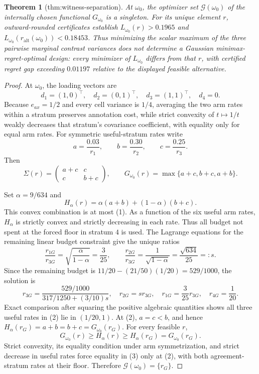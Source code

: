\documentclass{article}
\newtheorem{theorem}{Theorem}
\begin{document}
\begin{theorem}[thm:witness-separation]\label{thm:witness-separation}
At \(\omega_0\), the optimizer set \(\mathcal G(\omega_0)\) of the internally chosen functional \(G_{\omega_0}\) is a singleton. For its unique element \(r\), outward-rounded certificates establish \(L_{\omega_0}(r)>0.1965\) and \(L_{\omega_0}(r_{\mathrm{alt}}(\omega_0))<0.18453\). Thus minimizing the scalar maximum of the three pairwise marginal contrast variances does not determine a Gaussian minimax-regret-optimal design: every minimizer of \(L_{\omega_0}\) differs from that \(r\), with certified regret gap exceeding \(0.01197\) relative to the displayed feasible alternative.
\end{theorem}
\begin{proof}
At \(\omega_0\), the loading vectors are
\[
 d_1=(1,0)^\top,\quad d_2=(0,1)^\top,\quad d_3=(1,1)^\top,\quad d_4=0.
\]
Because \(e_{ax}=1/2\) and every cell variance is \(1/4\), averaging the two arm rates within a stratum preserves annotation cost, while strict convexity of \(t\mapsto1/t\) weakly decreases that stratum's covariance coefficient, with equality only for equal arm rates.  For symmetric useful-stratum rates write
\[
 a=\frac{0.03}{r_1},\qquad b=\frac{0.30}{r_2},\qquad c=\frac{0.25}{r_3}.
\]
Then
\[
 \Sigma(r)=\begin{pmatrix}a+c&c\\c&b+c\end{pmatrix},\qquad
 G_{\omega_0}(r)=\max\{a+c,b+c,a+b\}.                               \tag{1}
\]

Set \(\alpha=9/634\) and
\[
 H_\alpha(r)=\alpha(a+b)+(1-\alpha)(b+c).
\]
This convex combination is at most (1).  As a function of the six useful arm rates, \(H_\alpha\) is strictly convex and strictly decreasing in each rate.  Thus all budget not spent at the forced floor in stratum \(4\) is used.  The Lagrange equations for the remaining linear budget constraint give the unique ratios
\[
 \frac{r_{1G}}{r_{3G}}=\sqrt{\frac\alpha{1-\alpha}}=\frac3{25},\qquad
 \frac{r_{2G}}{r_{3G}}=\frac1{\sqrt{1-\alpha}}=\frac{\sqrt{634}}{25}=:s.
\]
Since the remaining budget is \(11/20-(21/50)(1/20)=529/1000\), the solution is
\[
 r_{3G}=\frac{529/1000}{317/1250+(3/10)s},\quad
 r_{2G}=sr_{3G},\quad r_{1G}=\frac3{25}r_{3G},\quad r_{4G}=\frac1{20}. \tag{2}
\]
Exact comparison after squaring the positive algebraic quantities shows all three useful rates in (2) lie in \((1/20,1)\).  At (2), \(a=c<b\), and hence \(H_\alpha(r_G)=a+b=b+c=G_{\omega_0}(r_G)\).  For every feasible \(r\),
\[
 G_{\omega_0}(r)\geq H_\alpha(r)\geq H_\alpha(r_G)=G_{\omega_0}(r_G). \tag{3}
\]
Strict convexity, its equality condition under arm symmetrization, and strict decrease in useful rates force equality in (3) only at (2), with both agreement-stratum rates at their floor.  Therefore \(\mathcal G(\omega_0)=\{r_G\}\).


\end{proof}
\end{document}
